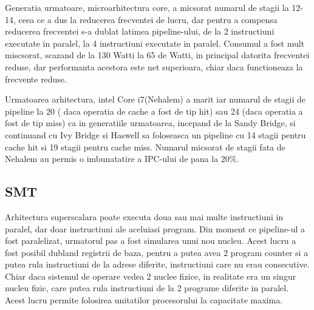 Generatia urmatoare, microarhitectura core, a micsorat numarul de stagii la 12-14, ceea ce a dus la
reducerea frecventei de lucru, dar pentru a compensa reducerea frecventei s-a dublat latimea pipeline-ului, de la 2 instructiuni executate
in paralel, la 4 instructiuni executate in paralel. Consumul a fost mult miscsorat, scazand de la
130 Watti la 65 de Watti, in principal datorita frecventei reduse, dar performanta acestora este
net superioara, chiar daca functioneaza la frecvente reduse.

Urmatoarea arhitectura, intel Core i7(Nehalem) a marit iar numarul de stagii de pipeline la 20 (
daca operatia de cache a fost de tip hit) sau 24 (daca operatia a fost de tip miss) ca in
generatiile urmatoarea, incepand de la Sandy Bridge, si continuand cu Ivy Bridge si Haswell sa
foloseasca un pipeline cu 14 stagii pentru cache hit si 19 stagii pentru cache miss. Numarul
micsorat de stagii fata de Nehalem au permis o imbunatatire a IPC-ului de pana la 20\%.

\subsection{SMT}

Arhitectura superscalara poate executa doua sau mai multe instructiuni in paralel, dar doar
instructiuni ale aceluiasi program. Din moment ce pipeline-ul a fost paralelizat, urmatorul pas a
fost simularea unui nou nucleu. Acest lucru a fost posibil dubland registrii de baza, pentru a
putea avea 2 program counter si a putea rula instructiuni de la adrese diferite, instructiuni care
nu erau consecutive. Chiar daca sistemul de operare vedea 2 nuclee fizice, in realitate era un
singur nucleu fizic, care putea rula instructiuni de la 2 programe diferite in paralel. Acest lucru
permite folosirea unitatilor procesorului la capacitate maxima.

